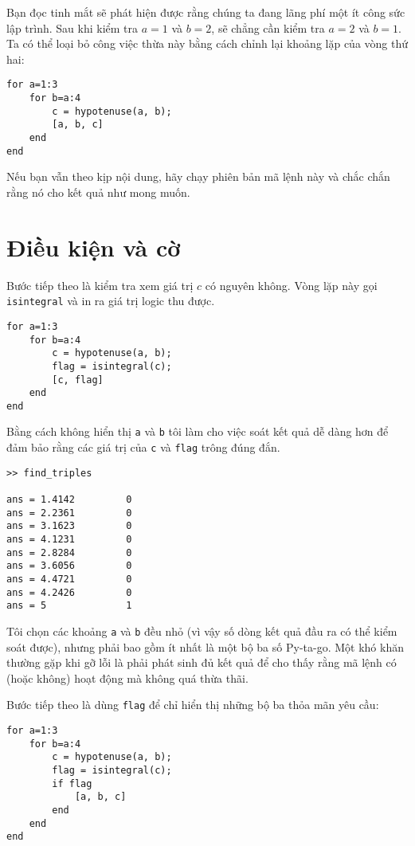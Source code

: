 \documentclass[12pt]{book}
\begin{document}
Bạn đọc tinh mắt sẽ phát hiện được rằng chúng ta đang lãng phí một
ít công sức lập trình. Sau khi kiểm tra $a=1$ và $b=2$, sẽ chẳng cần
kiểm tra $a=2$ và $b=1$. Ta có thể loại bỏ công việc thừa
này bằng cách chỉnh lại khoảng lặp của vòng thứ hai:

\begin{verbatim}
for a=1:3
    for b=a:4
        c = hypotenuse(a, b);
        [a, b, c]
    end
end
\end{verbatim}

Nếu bạn vẫn theo kịp nội dung, hãy chạy phiên bản mã lệnh này và
chắc chắn rằng nó cho kết quả như mong muốn.


\section{Điều kiện và cờ}

Bước tiếp theo là kiểm tra xem giá trị $c$ có nguyên không. Vòng lặp
này gọi {\tt isintegral} và in ra giá trị logic thu được.

\begin{verbatim}
for a=1:3
    for b=a:4
        c = hypotenuse(a, b);
        flag = isintegral(c);
        [c, flag]
    end
end
\end{verbatim}

Bằng cách không hiển thị {\tt a} và {\tt b} tôi làm cho việc soát
kết quả dễ dàng hơn để đảm bảo rằng các giá trị của {\tt c} và 
{\tt flag} trông đúng đắn.

\begin{verbatim}
>> find_triples

ans = 1.4142         0
ans = 2.2361         0
ans = 3.1623         0
ans = 4.1231         0
ans = 2.8284         0
ans = 3.6056         0
ans = 4.4721         0
ans = 4.2426         0
ans = 5              1
\end{verbatim}

Tôi chọn các khoảng {\tt a} và {\tt b} đều nhỏ (vì vậy số dòng
kết quả đầu ra có thể kiểm soát được), nhưng phải bao gồm
ít nhất là một bộ ba số Py-ta-go. Một khó khăn thường gặp khi
gỡ lỗi là phải phát sinh đủ kết quả để cho thấy rằng mã lệnh
có (hoặc không) hoạt động mà không quá thừa thãi.

Bước tiếp theo là dùng {\tt flag} để chỉ hiển thị những bộ ba
thỏa mãn yêu cầu:

\begin{verbatim}
for a=1:3
    for b=a:4
        c = hypotenuse(a, b);
        flag = isintegral(c);
        if flag
            [a, b, c]
        end
    end
end
\end{verbatim}
\end{document}
